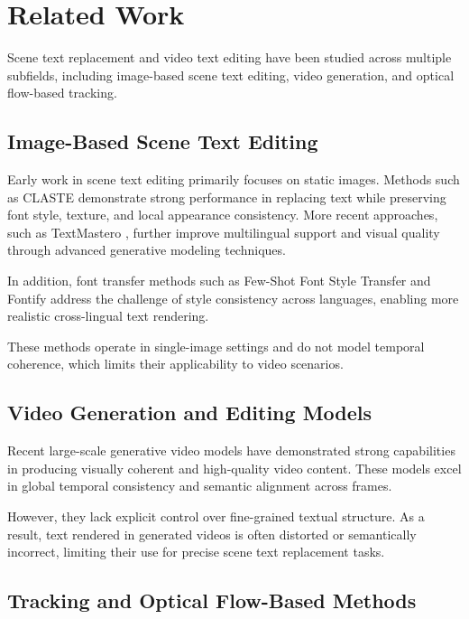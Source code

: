 \section{Related Work}
\label{sec:related_work}

Scene text replacement and video text editing have been studied across multiple subfields, including image-based scene text editing, video generation, and optical flow-based tracking.

\subsection{Image-Based Scene Text Editing}

Early work in scene text editing primarily focuses on static images. Methods such as CLASTE \cite{claste} demonstrate strong performance in replacing text while preserving font style, texture, and local appearance consistency. More recent approaches, such as TextMastero \cite{textmastero}, further improve multilingual support and visual quality through advanced generative modeling techniques.

In addition, font transfer methods such as Few-Shot Font Style Transfer \cite{fewshotfont} and Fontify \cite{fontify} address the challenge of style consistency across languages, enabling more realistic cross-lingual text rendering.

These methods operate in single-image settings and do not model temporal coherence, which limits their applicability to video scenarios.

\subsection{Video Generation and Editing Models}

Recent large-scale generative video models have demonstrated strong capabilities in producing visually coherent and high-quality video content. These models excel in global temporal consistency and semantic alignment across frames.

However, they lack explicit control over fine-grained textual structure. As a result, text rendered in generated videos is often distorted or semantically incorrect, limiting their use for precise scene text replacement tasks.

\subsection{Tracking and Optical Flow-Based Methods}

